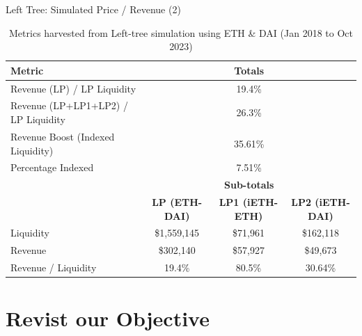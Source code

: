 \documentclass[10pt,xcolor=svgnames]{beamer} %
\begin{document}
\begin{frame}{Left Tree: Simulated Price / Revenue (2)}


\begin{table}[h]
\tiny
\centering
\begin{tabular}{ |l|c|c|c| } 
\hline
 \textbf{Metric} & \multicolumn{3}{|c|}{\textbf{Totals}}\\
\hline 
 Revenue (LP) / LP Liquidity & \multicolumn{3}{|c|}{19.4\% }\\
 Revenue (LP+LP1+LP2) / LP Liquidity & \multicolumn{3}{|c|}{26.3\% }\\
 Revenue Boost (Indexed Liquidity)  & \multicolumn{3}{|c|}{35.61\%}\\ 
 Percentage Indexed & \multicolumn{3}{|c|}{7.51\%}\\ 
 \hline
\hline
	& \multicolumn{3}{|c|}{\textbf{Sub-totals}} \\
  & \textbf{LP (ETH-DAI)} & \textbf{LP1 (iETH-ETH)} & \textbf{LP2 (iETH-DAI)} \\
\hline
Liquidity  & \$1,559,145 & \$71,961 & \$162,118\\
Revenue  & \$302,140 & \$57,927 & \$49,673\\
Revenue / Liquidity  & 19.4\% & 80.5\% & 30.64\%\\ 
\hline
\end{tabular}
\caption{Metrics harvested from Left-tree simulation using ETH \& DAI (Jan 2018 to Oct 2023)}
\label{table:simulator_components}
\end{table}

\end{frame}



\section{Revist our Objective}
\end{document}
